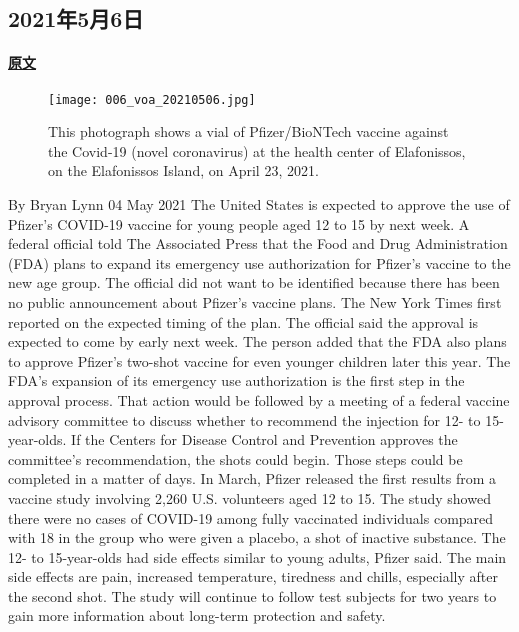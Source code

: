 \subsection{2021年5月6日}
\paragraph{\href{https://www.51voa.com/VOA_Special_English/us-expected-to-approve-pfizer-vaccine-for-teens-86799.html}{原文}}

\begin{figure}[H]
\centering
\texttt{[image: 006\_voa\_20210506.jpg]}
\caption{This photograph shows a vial of Pfizer/BioNTech vaccine against the Covid-19 (novel coronavirus) at the health center of Elafonissos, on the Elafonissos Island, on April 23, 2021.}
\end{figure}
By Bryan Lynn
04 May 2021
The United States is expected to approve the use of Pfizer's COVID-19 vaccine for young people aged 12 to 15 by next week.
A federal official told The Associated Press that the Food and Drug Administration (FDA) plans to expand its emergency use authorization for Pfizer's vaccine to the new age group.
The official did not want to be identified because there has been no public announcement about Pfizer's vaccine plans. The New York Times first reported on the expected timing of the plan.
The official said the approval is expected to come by early next week. The person added that the FDA also plans to approve Pfizer's two-shot vaccine for even younger children later this year.
The FDA's expansion of its emergency use authorization is the first step in the approval process. That action would be followed by a meeting of a federal vaccine advisory committee to discuss whether to recommend the injection for 12- to 15-year-olds.
If the Centers for Disease Control and Prevention approves the committee's recommendation, the shots could begin. Those steps could be completed in a matter of days.
In March, Pfizer released the first results from a vaccine study involving 2,260 U.S. volunteers aged 12 to 15. The study showed there were no cases of COVID-19 among fully vaccinated individuals compared with 18 in the group who were given a placebo, a shot of inactive substance.
The 12- to 15-year-olds had side effects similar to young adults, Pfizer said. The main side effects are pain, increased temperature, tiredness and chills, especially after the second shot. The study will continue to follow test subjects for two years to gain more information about long-term protection and safety.
